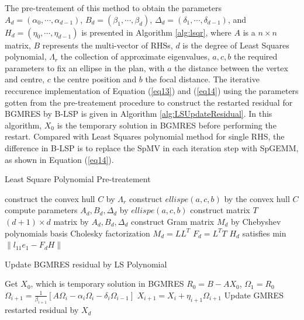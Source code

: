 The pre-treatement of this method to obtain the parameters $A_d=(\alpha_0, \cdots, \alpha_{d-1})$, $B_d=(\beta_1, \cdots, \beta_d)$, $\Delta_d=(\delta_1, \cdots, \delta_{d-1})$, and $H_d=(\eta_0, \cdots, \eta_{d-1})$ is presented in Algorithm \ref{alg:lsqr}, where $A$ is a $n\times n$ matrix, $B$ represents the multi-vector of RHSs, $d$ is the degree of Least Squares polynomial, $\Lambda_r$ the collection of approximate eigenvalues, $a,c,b$ the required parameters to fix an ellipse in the plan, with $a$ the distance between the vertex and centre, $c$ the centre position and $b$ the focal distance. The iterative reccurence implementation of Equation (\ref{eq13}) and (\ref{eq14}) using the parameters gotten from the pre-treatement procedure to construct the restarted residual for BGMRES by B-LSP is given in Algorithm \ref{alg:LSUpdateResidual}. In this algorithm, $X_0$ is the temporary solution in BGMRES before performing the restart. Compared with Least Squares polynomial method for single RHS, the difference in B-LSP is to replace the SpMV in each iteration step with SpGEMM, as shown in Equation (\ref{eq14}).

\begin{algorithm}[htbp]
	\caption{Least Square Polynomial Pre-treatement}
	\label{alg:lsqr}
	\begin{algorithmic}[1]
		\State construct the convex hull $C$ by $\Lambda_r$
		\State construct $ellispe(a,c,b)$ by the convex hull $C$
		\State compute parameters $A_d, B_d, \Delta_d$ by $ellispe(a,c,b)$
		\State construct matrix $T$ ${(d+1)} \times d$ matrix by $A_d, B_d, \Delta_d$
		\State construct Gram matrix $M_d$ by Chebyshev polynomials basis
		\State Cholesky factorization $M_d=LL^T$
		\State $F_d=L^TT$
		\State $H_d$ satisfies min $\|l_{11}e_1-F_d H\|$
		\EndFunction
	\end{algorithmic}
\end{algorithm}

\begin{algorithm}[htbp]{}
	\caption{Update BGMRES residual by LS Polynomial}   
	\label{alg:LSUpdateResidual}   
	\begin{algorithmic}[1]
		\State Get $X_0$, which is temporary solution in BGMRES
		\State $R_0=B-AX_0$, $\Omega_1 = R_0$
		\State $\Omega_{i+1}=\frac{1}{\beta_{i+1}}[A\Omega_i-\alpha_i\Omega_i-\delta_i\Omega_{i-1}]$
		\State $X_{i+1}=X_i+\eta_{i+1}\Omega_{i+1}$
		\EndFor
		\EndFor
		\State Update GMRES restarted residual by $X_{d}$
		\EndFunction
	\end{algorithmic}  
\end{algorithm}

